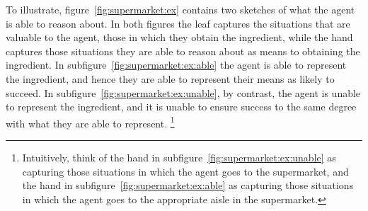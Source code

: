 \documentclass[10pt]{article}
\begin{document}
To illustrate, figure~\ref{fig:supermarket:ex} contains two sketches of what the agent is able to reason about.
In both figures the leaf captures the situations that are valuable to the agent, those in which they obtain the ingredient, while the hand captures those situations they are able to reason about as means to obtaining the ingredient.
In subfigure~\ref{fig:supermarket:ex:able} the agent is able to represent the ingredient, and hence they are able to represent their means as likely to succeed.
In subfigure~\ref{fig:supermarket:ex:unable}, by contrast, the agent is unable to represent the ingredient, and it is unable to ensure success to the same degree with what they are able to represent.\nolinebreak
\footnote{
  Intuitively, think of the hand in subfigure~\ref{fig:supermarket:ex:unable} as capturing those situations in which the agent goes to the supermarket, and the hand in subfigure~\ref{fig:supermarket:ex:able} as capturing those situations in which the agent goes to the appropriate aisle in the supermarket.
}
\end{document}
